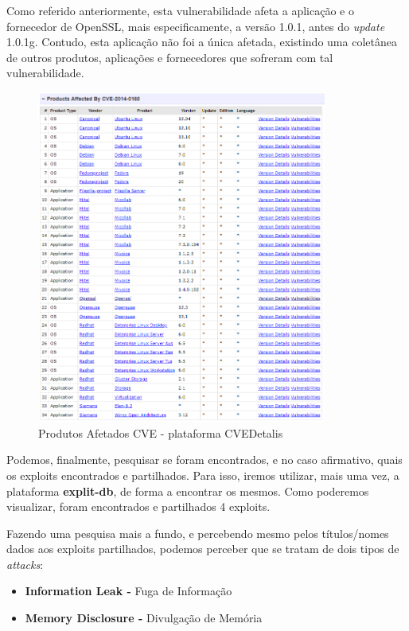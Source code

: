 \documentclass[11t]{article}
\begin{document}
Como referido anteriormente, esta vulnerabilidade afeta a aplicação e o fornecedor de OpenSSL, mais especificamente, a versão 1.0.1, antes do \textit{update} 1.0.1g. Contudo, esta aplicação não foi a única afetada, existindo uma coletânea de outros produtos, aplicações e fornecedores que sofreram com tal vulnerabilidade.

\begin{figure}[H]
    \centering
    \includegraphics[width=0.85\textwidth]{images/produtosAfetadosPergunta3.png}
    \caption{Produtos Afetados CVE - plataforma CVEDetalis}
\end{figure}

\clearpage

Podemos, finalmente, pesquisar se foram encontrados, e no caso afirmativo, quais os exploits encontrados e partilhados. Para isso, iremos utilizar, mais uma vez, a plataforma \textbf{explit-db}, de forma a encontrar os mesmos. Como poderemos visualizar, foram encontrados e partilhados 4 exploits.

\vspace{0.1cm}

Fazendo uma pesquisa mais a fundo, e percebendo mesmo pelos títulos/nomes dados aos exploits partilhados, podemos perceber que se tratam de dois tipos de \textit{attacks}:
\begin{itemize}
    \item \textbf{Information Leak - }Fuga de Informação
    \item \textbf{Memory Disclosure - }Divulgação de Memória
\end{itemize}
\end{document}
